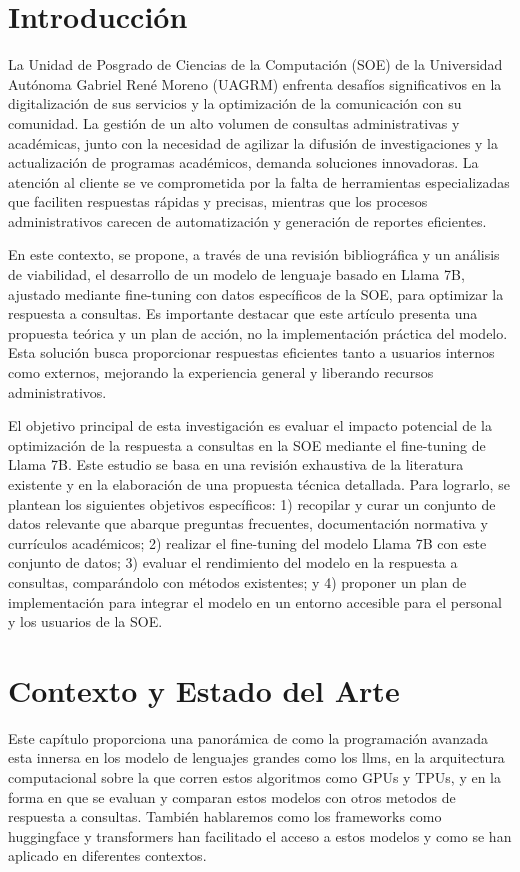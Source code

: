\documentclass[12pt,twocolumn]{article}
\begin{document}

\section{Introducción}
La Unidad de Posgrado de Ciencias de la Computación (SOE) de la Universidad Autónoma Gabriel René Moreno (UAGRM) enfrenta desafíos significativos en la digitalización de sus servicios y la optimización de la comunicación con su comunidad. 
La gestión de un alto volumen de consultas administrativas y académicas, junto con la necesidad de agilizar la difusión de investigaciones y la actualización de programas académicos, demanda soluciones innovadoras. 
La atención al cliente se ve comprometida por la falta de herramientas especializadas que faciliten respuestas rápidas y precisas, mientras que los procesos administrativos carecen de automatización y generación de reportes eficientes.

En este contexto, se propone, a través de una revisión bibliográfica y un análisis de viabilidad, el desarrollo de un modelo de lenguaje basado en Llama 7B, ajustado mediante fine-tuning con datos específicos de la SOE, para optimizar la respuesta a consultas. 
Es importante destacar que este artículo presenta una propuesta teórica y un plan de acción, no la implementación práctica del modelo. 
Esta solución busca proporcionar respuestas eficientes tanto a usuarios internos como externos, mejorando la experiencia general y liberando recursos administrativos.

El objetivo principal de esta investigación es evaluar el impacto potencial de la optimización de la respuesta a consultas en la SOE mediante el fine-tuning de Llama 7B. 
Este estudio se basa en una revisión exhaustiva de la literatura existente y en la elaboración de una propuesta técnica detallada.
Para lograrlo, se plantean los siguientes objetivos específicos: 
1) recopilar y curar un conjunto de datos relevante que abarque preguntas frecuentes, documentación normativa y currículos académicos; 
2) realizar el fine-tuning del modelo Llama 7B con este conjunto de datos; 
3) evaluar el rendimiento del modelo en la respuesta a consultas, comparándolo con métodos existentes; y 
4) proponer un plan de implementación para integrar el modelo en un entorno accesible para el personal y los usuarios de la SOE.

\section{Contexto y Estado del Arte}
Este capítulo proporciona una panorámica de como la programación avanzada esta innersa en los modelo de lenguajes grandes como los llms, en la arquitectura computacional sobre la que corren estos algoritmos como GPUs y TPUs, y en la forma en que se evaluan y comparan estos modelos con otros metodos de respuesta a consultas.
También hablaremos como los frameworks como huggingface y transformers han facilitado el acceso a estos modelos y como se han aplicado en diferentes contextos.
\end{document}
